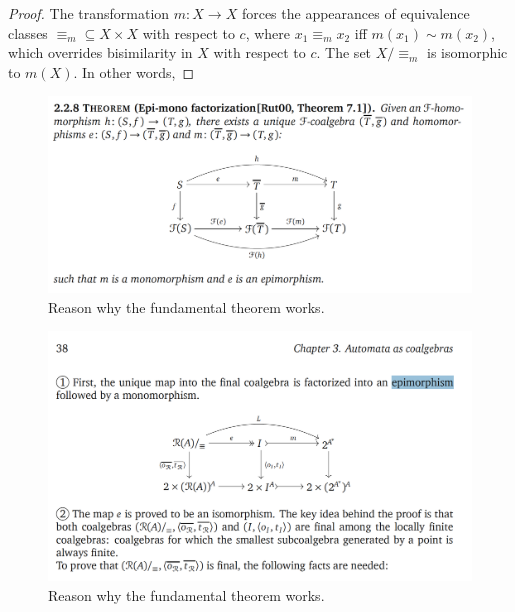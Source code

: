 \begin{definition}
\begin{proof}
    The transformation $m\colon X\rightarrow X$ forces the appearances of equivalence classes $\equiv_m\subseteq X\times X$ with respect to $c$, where $x_1\equiv_m x_2$ iff $m(x_1)\sim m(x_2)$, which overrides bisimilarity in $X$ with respect to $c$. The set $X/\equiv_m$ is isomorphic to $m(X)$. In other words, 
\end{proof}

\begin{figure}[t]
    \centering
    \includegraphics[width=1\textwidth]{Figures/Epi-monofactorisation.png}
    \caption{Reason why the fundamental theorem works.}
    \label{fig:LambdaCurves}
    \end{figure}

\begin{figure}[t]
    \centering
    \includegraphics[width=1\textwidth]{Figures/FundamentalTheo.png}
    \caption{Reason why the fundamental theorem works.}
    \label{fig:LambdaCurves}
    \end{figure}


\end{definition}
